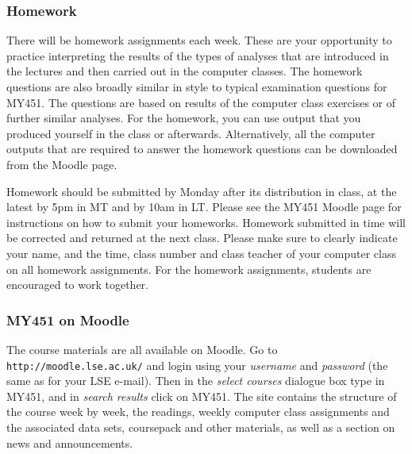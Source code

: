 


\subsubsection{Homework}

There will be homework assignments each week. These are your opportunity
to practice interpreting the results of the types of analyses that are introduced in
the lectures and then carried out in the computer classes. The homework questions
are also broadly similar in style to typical examination questions for
MY451. The questions are based on results of the computer class
exercises or of further similar analyses. For the homework, you can
use output that you produced yourself in the class or afterwards.
Alternatively, all the computer outputs that are
required to answer the homework questions can be downloaded from the
Moodle page.

Homework should be submitted by Monday after its distribution in class, at the latest
by 5pm in MT and by 10am in LT. Please see the MY451 Moodle page for
instructions on how to submit your homeworks.
Homework submitted in time will be corrected and returned at the next
class. Please make sure to clearly indicate your name, and the time,
class number and class teacher of your computer class on all homework
assignments. For the homework assignments, students are
encouraged to work together.

\subsubsection{MY451 on Moodle}
\label{sss_moodle}
The course materials are all available on Moodle. Go to
\texttt{http://moodle.lse.ac.uk/} and login using your \emph{username}
and \emph{password} (the same as for your LSE e-mail). Then in the
\emph{select courses} dialogue box type in MY451, and in \emph{search
results} click on MY451. The site contains the structure of the course
week by week, the readings, weekly computer class assignments and the
associated data sets, coursepack and other materials, as well as a
section on news and announcements.

